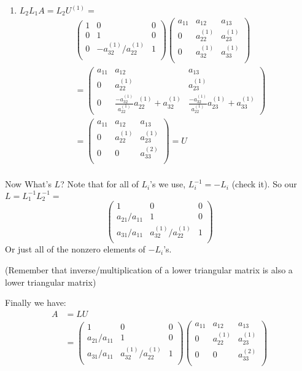 \begin{enumerate}
\item $ L_2L_1A=L_2U^{(1)}=$  \begin{align*}
    &\begin{pmatrix}
  1 &  0&0\\
  0 & 1 & 0 \\
0&  -a_{32}^{(1)}/a_{22}^{(1)}& 1 \\
  \end{pmatrix}\begin{pmatrix}
  a_{11}&  a_{12}&  a_{13}\\
0& a_{22}^{(1)}&   a_{23}^{(1)}\\ 
0&  a_{32}^{(1)}&  a_{33}^{(1)}\\
\end{pmatrix}\\
&=\begin{pmatrix}
  a_{11}&  a_{12}&  a_{13}\\
0& a_{22}^{(1)}& a_{23}^{(1)}\\ 
0 & \frac{-a_{32}^{(1)}}{a_{22}^{(1)}}a_{22}^{(1)}+a_{32}^{(1)}& \frac{-a_{32}^{(1)}}{a_{22}^{(1)}}a_{23}^{(1)}+a_{33}^{(1)}
\end{pmatrix}\\
&=\begin{pmatrix}
  a_{11}&  a_{12}&  a_{13}\\
0& a_{22}^{(1)}& a_{23}^{(1)}\\ 
0&  0&  a_{33}^{(2)}\\
\end{pmatrix} = U\\
  \end{align*}
\end{enumerate}

Now What's $L$? Note that for all of $L_i$'s we use, $L_i^{-1} = -L_i$ (check it). So our 
$L=L_1^{-1}L_2^{-1} =$
$$\begin{pmatrix}
  1&0&0\\
  a_{21}/a_{11}& 1 & 0\\
a_{31}/a_{11}& a_{32}^{(1)}/a_{22}^{(1)}& 1 \\
\end{pmatrix}
$$ Or just all of the nonzero elements of $-L_i$'s.

(Remember that inverse/multiplication of a lower triangular matrix is also a lower
triangular matrix)

\noi
Finally we have:
\begin{align*}
A &= LU  \\
&=\begin{pmatrix}
  1&0&0\\
  a_{21}/a_{11}& 1 & 0\\
a_{31}/a_{11}& a_{32}^{(1)}/a_{22}^{(1)}& 1 \\
\end{pmatrix}\begin{pmatrix}
  a_{11}&  a_{12}&  a_{13}\\
0& a_{22}^{(1)}& a_{23}^{(1)}\\ 
0&  0&  a_{33}^{(2)}\\
\end{pmatrix}
\end{align*}


